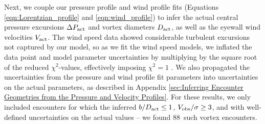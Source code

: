\documentclass[linenumbers,trackchanges]{aastex63}
\newcommand{\boverDactltone}{88}
\begin{document}


Next, we couple our pressure profile and wind profile fits (Equations \ref{eqn:Lorentzian_profile} and \ref{eqn:wind_profile}) to infer the actual central pressure excursions $\Delta P_{\rm act}$ and vortex diameters $D_{\rm act}$, as well as the eyewall wind velocities $V_{\rm act}$. The wind speed data showed considerable turbulent excursions not captured by our model, so as we fit the wind speed models, we inflated the data point and model parameter uncertainties by multiplying by the square root of the reduced $\chi^2$-values, effectively imposing $\chi^2 = 1$ \citep[cf.][]{Press2007}. We also propagated the uncertainties from the pressure and wind profile fit parameters into uncertainties on the actual parameters, as described in Appendix \ref{sec:Inferring Encounter Geometries from the Pressure and Velocity Profiles}. For these results, we only included encounters for which the inferred $b/D_{\rm act} \leq 1$, $V_{\rm obs}/\sigma \geq 3$, and with well-defined uncertainties on the actual values -- we found \boverDactltone\ such vortex encounters. 
\end{document}
